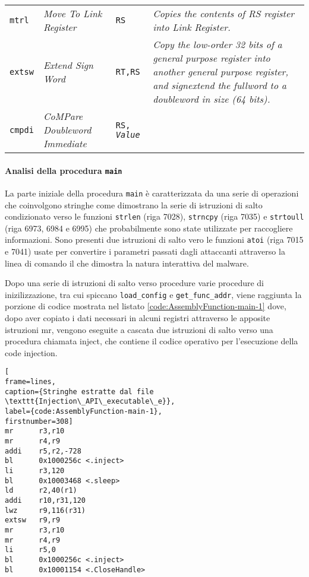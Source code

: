 \documentclass[10pt,a4paper, titlepage]{report}
\begin{document}
\begin{table}[h!]
\begin{center}
\begin{adjustbox}{center=\textwidth}
\begin{tabular}{l|l|l|p{6cm}}
	       	\texttt{mtrl} & \textit{Move To Link Register} & \texttt{RS} & \textit{Copies the contents of RS register into Link Register.} \\

\texttt{extsw} & \textit{Extend Sign Word} & \texttt{RT,RS} & \textit{Copy the low-order 32 bits of a general purpose register into another general purpose register, and signextend the fullword to a doubleword in size (64 bits).} \\
	       	
	       	\texttt{cmpdi} & \textit{CoMPare Doubleword Immediate} & \texttt{RS, \textit{Value}} \\
	       	
	      \bottomrule
	    \end{tabular}
	       \end{adjustbox}
	  \end{center}
	\end{table}

\paragraph{Analisi della procedura \texttt{main}} 

La parte iniziale della procedura \texttt{main} è caratterizzata da una serie di operazioni che coinvolgono stringhe come dimostrano la serie di istruzioni di salto condizionato verso le funzioni \texttt{strlen} (riga 7028), \texttt{strncpy} (riga 7035) e \texttt{strtoull} (riga 6973, 6984 e 6995) che probabilmente sono state utilizzate per raccogliere informazioni. Sono presenti due istruzioni di salto vero le funzioni \texttt{atoi} (riga 7015 e 7041) usate per convertire i parametri passati dagli attaccanti attraverso la linea di comando il che dimostra la natura interattiva del malware.

Dopo una serie di istruzioni di salto verso procedure varie procedure di inizilizzazione, tra cui spiccano \texttt{load\_config} e \texttt{get\_func\_addr}, viene raggiunta la porzione di codice mostrata nel listato \ref{code:AssemblyFunction-main-1} dove, dopo aver copiato i dati necessari in alcuni registri attraverso le apposite istruzioni mr, vengono eseguite a cascata due istruzioni di salto verso una procedura chiamata inject, che contiene il codice operativo per l'esecuzione della code injection. 

\begin{lstlisting}[
frame=lines, 
caption={Stringhe estratte dal file \texttt{Injection\_API\_executable\_e}}, 
label={code:AssemblyFunction-main-1},
firstnumber=308]
mr      r3,r10
mr      r4,r9
addi    r5,r2,-728
bl      0x1000256c <.inject>
li      r3,120
bl      0x10003468 <.sleep>
ld      r2,40(r1)
addi    r10,r31,120
lwz     r9,116(r31)
extsw   r9,r9
mr      r3,r10
mr      r4,r9
li      r5,0
bl      0x1000256c <.inject>
bl      0x10001154 <.CloseHandle>
\end{lstlisting}
\end{document}
